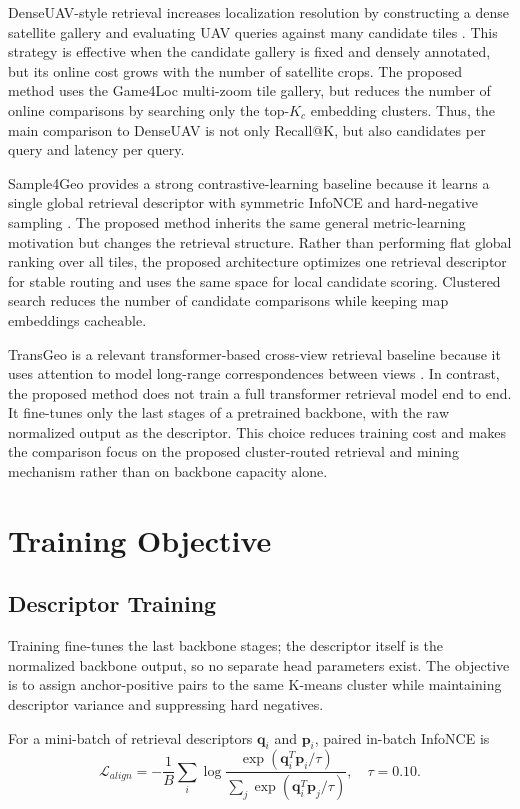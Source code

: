 \documentclass[conference]{IEEEtran}
\begin{document}
DenseUAV-style retrieval increases localization resolution by constructing a
dense satellite gallery and evaluating UAV queries against many candidate
tiles \cite{dai2024denseuav}. This strategy is effective when the candidate
gallery is fixed and densely annotated, but its online cost grows with the
number of satellite crops. The proposed method uses the Game4Loc multi-zoom tile gallery,
but reduces the number of online comparisons by
searching only the top-$K_c$ embedding clusters. Thus, the main comparison to
DenseUAV is not only Recall@K, but also candidates per query and latency per
query.

Sample4Geo provides a strong contrastive-learning baseline because it learns a
single global retrieval descriptor with symmetric InfoNCE and hard-negative
sampling \cite{deuser2023sample4geo}. The proposed method inherits the same
general metric-learning motivation but changes the retrieval structure. Rather
than performing flat global ranking over all tiles, the proposed architecture
optimizes one retrieval descriptor for stable routing and uses the same
space for local candidate scoring. Clustered search reduces the number of
candidate comparisons while keeping map embeddings cacheable.

TransGeo is a relevant transformer-based cross-view retrieval baseline because
it uses attention to model long-range correspondences between views
\cite{zhu2022transgeo}. In contrast, the proposed method does not train a full
transformer retrieval model end to end. It fine-tunes only the last stages of
a pretrained backbone, with the raw normalized output as the descriptor. This
choice reduces training cost and makes the
comparison focus on the proposed cluster-routed retrieval and mining
mechanism rather than on backbone capacity alone.

\section{Training Objective}
\subsection{Descriptor Training}
Training fine-tunes the last backbone stages; the descriptor itself is the
normalized backbone output, so no separate head parameters exist. The
objective is to assign
anchor-positive pairs to the same K-means cluster while maintaining descriptor
variance and suppressing hard negatives.

For a mini-batch of retrieval descriptors $\mathbf{q}_i$ and
$\mathbf{p}_i$, paired in-batch InfoNCE is
\begin{equation}
\mathcal{L}_{align}
=-\frac{1}{B}\sum_i
\log
\frac{\exp(\mathbf{q}_i^T\mathbf{p}_i/\tau)}
{\sum_j\exp(\mathbf{q}_i^T\mathbf{p}_j/\tau)},
\quad \tau=0.10.
\end{equation}
\end{document}
